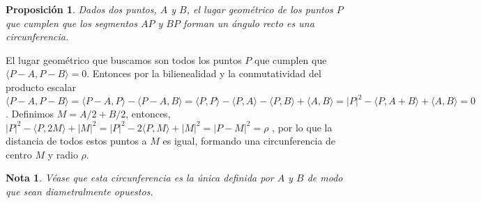 \documentclass[11pt, a4paper]{article}
\makeatletter
\newif\IfInSansMode
\let\oldsf\sffamily
\renewcommand*{\sffamily}{\oldsf\mathversion{sans}\InSansModetrue}
\let\oldnorm\normalfont
\renewcommand*{\normalfont}{\oldnorm\InSansModefalse\mathversion{normal}}
\renewenvironment{proof}[1][\proofname] {\vspace{-15pt}\par\pushQED{\qed}\normalfont\topsep6\p@\@plus6\p@\relax\trivlist\item[\hskip\labelsep\it#1\@addpunct{.}]\ignorespaces}{\popQED\endtrivlist\@endpefalse}
\renewenvironment{proof}[1][\proofname] {\par\pushQED{\qed}\normalfont\topsep6\p@\@plus6\p@\relax\trivlist\item[\hskip\labelsep\itshape\sffamily#1\@addpunct{.}]\ignorespaces}{\popQED\endtrivlist\@endpefalse}
\theoremstyle{theorem-style}
\newtheorem{nprop}{Proposición}[section]
\theoremstyle{definition-style}
\theoremstyle{remark-style}
\newtheorem*{nota}{Nota}
\theoremstyle{example-style}
\makeatother
\begin{document}
\begin{nprop}
  Dados dos puntos, $A$ y $B$, el lugar geométrico de los puntos $P$ que cumplen que los segmentos $AP$ y $BP$ forman un ángulo recto es una circunferencia.
\end{nprop}

\begin{proof}
	El lugar geométrico que buscamos son todos los puntos $P$ que cumplen que $\langle P-A, P-B\rangle =0$. Entonces por la bilienealidad y la conmutatividad del producto escalar $\langle P-A,P-B\rangle  = \langle P-A,P\rangle  - \langle  P-A,B\rangle  = \langle P,P\rangle  - \langle P,A\rangle  - \langle P,B\rangle  + \langle A,B\rangle  = | P|^2 - \langle P,A+B\rangle  + \langle A,B\rangle  = 0  $. Definimos $M=A/2+B/2 $, entonces, %
	$|P|^2 - \langle P,2M\rangle  + |M|^2 = |P|^2 - 2\langle P,M\rangle  + |M|^2 = |P-M|^2 = \rho$ ,  por lo que la distancia de todos estos puntos a $M$ es igual, formando una circunferencia de centro $M$ y radio $\rho$. 
\end{proof}

\begin{nota}
	Véase que esta circunferencia es la única definida por $A$ y $B$ de modo que sean diametralmente opuestos.
\end{nota}
\end{document}
